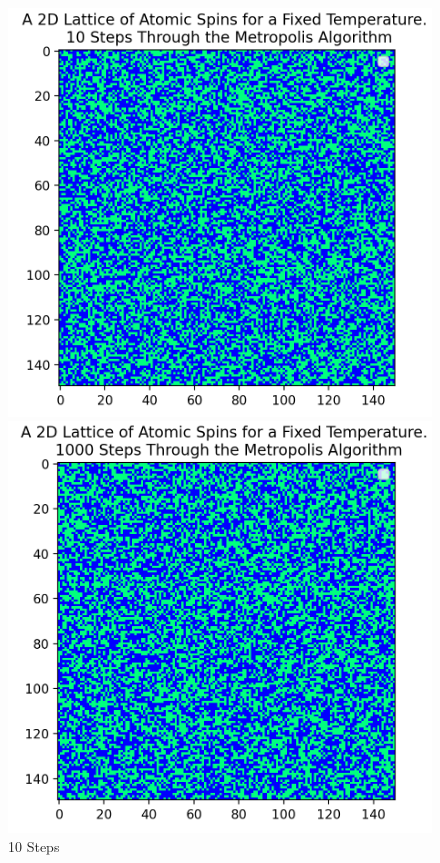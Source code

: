 \documentclass[a4paper]{article}
\begin{document}
\begin{figure}[!htb]
  \includegraphics[width=\linewidth]{10 steps.png}
  \caption{10 Steps}\label{fig:10steps}
\endminipage\hfill
{}
  \includegraphics[width=\linewidth]{1000 steps.png}

\end{figure}
\end{document}
